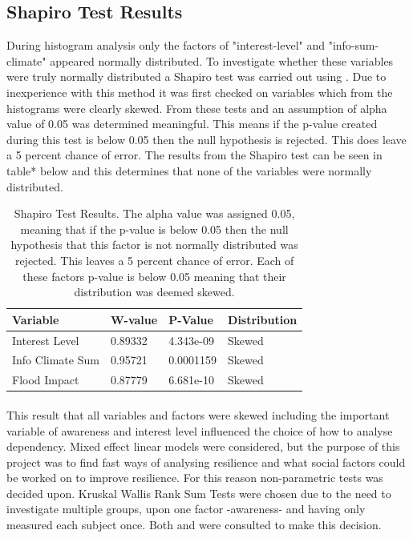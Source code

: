 \subsection{Shapiro Test Results}

During histogram analysis only the factors of "interest-level" and "info-sum-climate" appeared normally distributed. To investigate whether these variables were truly normally distributed a Shapiro test was carried out using \cite{royston_extension_1982} . Due to inexperience with this method it was first checked on variables which from the histograms were clearly skewed. From these tests and \cite{royston_extension_1982} an assumption of alpha value of 0.05 was determined meaningful. This means if the p-value created during this test is below 0.05 then the null hypothesis is rejected. This does leave a 5 percent chance of error. The results from the Shapiro test can be seen in table* below and this determines that none of the variables were normally distributed. 

\begin{table}[h!]
    \centering
    \begin{tabular}{|l|l|l|l|}
    \hline
         Variable & W-value & P-Value & Distribution \\ \hline
       Interest Level & 0.89332 & 4.343e-09 & Skewed \\ \hline
         Info Climate Sum  & 0.95721 & 0.0001159 & Skewed \\ \hline
        Flood Impact & 0.87779 & 6.681e-10 & Skewed \\ \hline
     \end{tabular}
    \caption{Shapiro Test Results. The alpha value was assigned 0.05, meaning that if the p-value is below 0.05 then the null hypothesis that this factor is not normally distributed was rejected. This leaves a 5 percent chance of error. Each of these factors p-value is below 0.05 meaning that their distribution was deemed skewed.}
    \label{table:shapiro_test_results}
\end{table}
\paragraph{}

This result that all variables and factors were skewed including the important variable of awareness and interest level influenced the choice of how to analyse dependency. Mixed effect linear models were considered, but the purpose of this project was to find fast ways of analysing resilience and what social factors could be worked on to improve resilience. For this reason non-parametric tests was decided upon. Kruskal Wallis Rank Sum Tests were chosen due to the need to investigate multiple groups, upon one factor -awareness- and having only measured each subject once. Both \cite{tasman_how_2014} and \cite{hollander_nonparametric_2014} were consulted to make this decision. 

